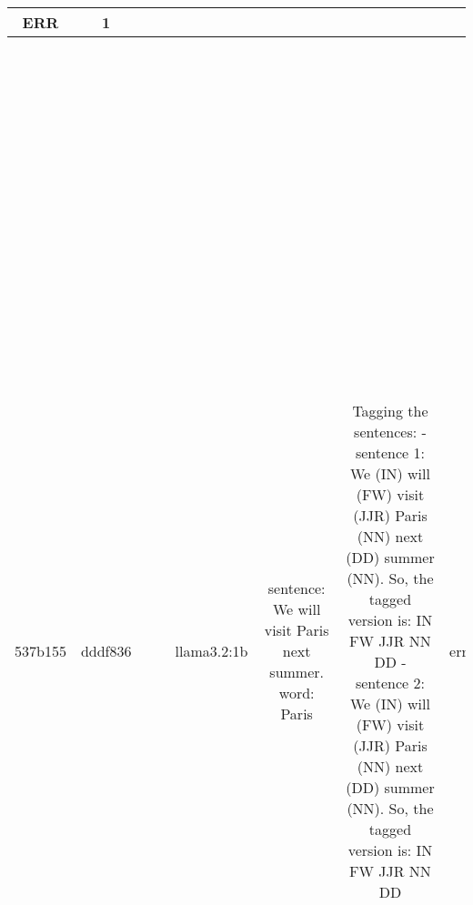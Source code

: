 \begin{table}[h!]
\begin{tabular}{|c|c|c|c|c|c|c|c|c|c|}
ERR & 1\\
\hline
537b155 & dddf836 &  &  & llama3.2:1b & sentence: We will visit Paris next summer. word: Paris & Tagging the sentences:
- sentence 1: We (IN) will (FW) visit (JJR) Paris (NN) next (DD) summer (NN). So, the tagged version is: IN FW JJR NN DD
- sentence 2: We (IN) will (FW) visit (JJR) Paris (NN) next (DD) summer (NN). So, the tagged version is: IN FW JJR NN DD & err & The task requires the chatbot to return just the part of speech (POS) tag for a given word within a sentence. However:

1. The output provides a list of tagged words along with their tags.
2. The output includes non-existent tags such as "DD" which is not in the list of part-of-speech tags provided in the description. 
3. It also shows the entire sentence along with the tags for each word, rather than just providing a single POS tag for the given word.

Since the task specifies returning just the part-of-speech tag for a given word, the additional information and incorrectly listed tags in the output violate the task's requirements.

Mention the reason for violation and your thinking went into coming up with it.
ERR & 1\\
\hline
8c984ce & dddf836 &  &  & llama3.2:1b & sentence: They haven't arrived at the station yet. word: arrived & JJ 
JJR: 
JJS & err & The chatbot's output includes multiple part-of-speech tags: "JJ", "JJR:", and "JJS". According to the task description, the bot is required to return only one part-of-speech tag for the given word. If the word cannot be tagged with one of the listed tags, it should return "Unknown", and if it is unable to tag the word, it should return "CantAnswer". The presence of multiple outputs suggests non-compliance, as the task calls for a singular tag output based on what fits the word best or one of the specified alternatives ("Unknown" or "CantAnswer"). Additionally, the presence of a colon (":") after "JJR" is unnecessary and suggests formatting or output consistency issues, further indicating non-compliance with the instruction to return only the tag.

ERR & 1\\
\hline
e05253f & dddf836 &  &  & llama3.2:1b & sentence: Tom and Jerry are famous cartoon characters. word: and & For the first sentence, tag: ADP (Adposition) 
For the second sentence, tag: CC (Coordinating conjunction) & err & The chatbot output presents two part-of-speech tags: "ADP (Adposition)" and "CC (Coordinating conjunction)". According to the description, the output should conform to a specific list of part-of-speech tags, which does not include "ADP (Adposition)". The tag "ADP (Adposition)" is not part of the provided list, which means it does not comply with the task's requirements. The correct tag for "CC" (Coordinating conjunction) does match the list, but the presence of "ADP" alongside the requirement to return only from the list provided or specified error tags ('Unknown' or 'CantAnswer') results in non-compliance. 


\end{tabular}
\end{table}

